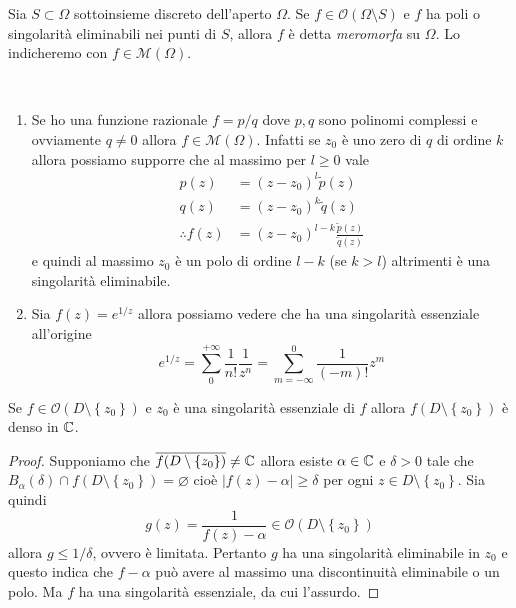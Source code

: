 \begin{definition}
  Sia $S \subset \Omega$ sottoinsieme discreto dell'aperto $\Omega$. Se $f \in
  \mathcal{O}(\Omega \setminus S)$ e $f$ ha poli o singolarità eliminabili nei
  punti di $S$, allora $f$ è detta \emph{meromorfa} su $\Omega$. Lo indicheremo
  con $f \in \mathcal{M}(\Omega)$.
  \label{def:meromorfismo}
\end{definition}

\begin{example}\
  \begin{enumerate}
    \item Se ho una funzione razionale $f= p / q$ dove $p,q$ sono polinomi complessi
      e ovviamente $q \neq 0$ allora $f \in \mathcal{M}(\Omega)$. Infatti se
      $z_0$ è uno zero di $q$ di ordine $k$ allora possiamo supporre che al
      massimo per $l \ge 0$ vale 
      \begin{align*}
       p(z)  & = (z-z_0)^l \tilde{p}(z)  \\
       q(z)  & = (z-z_0)^k \tilde{q}(z) \\
       \therefore f(z)  & = (z-z_0)^{l-k}\frac{\tilde{p}(z)}{\tilde{q}(z)}
      \end{align*}
      e quindi al massimo $z_0$ è un polo di ordine $l-k$ (se $k > l$)
      altrimenti è una singolarità eliminabile. 
    \item Sia $f(z) = e^{1/z}$ allora possiamo vedere che ha una singolarità
      essenziale all'origine
      \begin{equation*}
        e^{1/z} = \sum_{0}^{+\infty} \frac{1}{n!}\frac{1}{z^n} = \sum_{m
        = -\infty}^{0} \frac{1}{(-m)!} z^m 
      \end{equation*}
  \end{enumerate}
\end{example}

\begin{theorem}
    Se $f \in \mathcal{O}(D \setminus \left\{z_0  \right\})$ e $z_0$ è una
    singolarità essenziale di $f$ allora $f(D \setminus \left\{ z_0 \right\})$
    è denso in $\mathbb{C}$.
  \label{thr:casorati_weierstrass}
\end{theorem}
\begin{proof}
  Supponiamo che $\overline{f(D \setminus \left\{ z_0 \right\})} \neq \mathbb{C}$ allora
  esiste $\alpha \in \mathbb{C}$ e $\delta > 0$ tale che $B_{\alpha}(\delta) \cap f(D
  \setminus \left\{ z_0 \right\}) = \varnothing$ cioè $|f(z) - \alpha| \ge
  \delta$ per ogni $z \in D \setminus \left\{ z_0 \right\}$. Sia quindi
  \begin{equation*}
    g(z) = \frac{1}{f(z) - \alpha} \in \mathcal{O}(D \setminus \left\{ z_0
      \right\})
  \end{equation*}
  allora $g \le 1/\delta$, ovvero è limitata. Pertanto $g$ ha una singolarità
  eliminabile in $z_0$ e questo indica che $f - \alpha$ può avere al massimo una
  discontinuità eliminabile o un polo. Ma $f$ ha una singolarità essenziale, da
  cui l'assurdo.
\end{proof}


